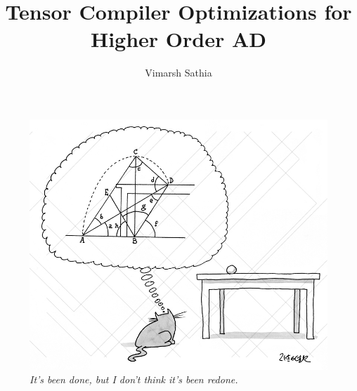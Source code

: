 \documentclass{article}
\title{Tensor Compiler Optimizations for Higher Order AD}
\author{Vimarsh Sathia}
\begin{document}
\thispagestyle{fancy}
\begin{figure}
    \centering
    \includegraphics[scale=0.3]{cat_math.jpg}
    \caption*{\textit{It's been done, but I don't think it's been redone.}}
\end{figure}
\end{document}
